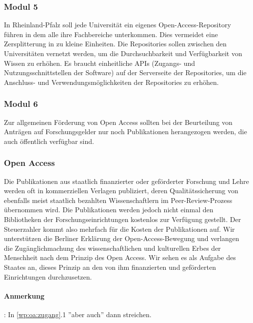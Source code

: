 \subsubsection{Modul 5}
\abstimmung
In Rheinland-Pfalz soll jede Universität ein eigenes Open-Access-Repository führen in dem alle ihre Fachbereiche unterkommen. Dies vermeidet eine Zersplitterung in zu kleine Einheiten. Die Repositories sollen zwischen den Universitäten vernetzt werden, um die Durchsuchbarkeit und Verfügbarkeit von Wissen zu erhöhen. Es braucht einheitliche APIs (Zugangs- und Nutzungsschnittstellen der Software) auf der Serverseite der Repositories, um die Anschluss- und Verwendungsmöglichkeiten der Repositories zu erhöhen.

\subsubsection{Modul 6}
\abstimmung
Zur allgemeinen Förderung von Open Access sollten bei der Beurteilung von Anträgen auf Forschungsgelder nur noch Publikationen herangezogen werden, die auch öffentlich verfügbar sind.
 

\subsubsection{Open Access}
\abstimmung
Die Publikationen aus staatlich finanzierter oder geförderter Forschung und Lehre werden oft in kommerziellen Verlagen publiziert, deren Qualitätssicherung von ebenfalls meist staatlich bezahlten Wissenschaftlern im Peer-Review-Prozess übernommen wird. Die Publikationen werden jedoch nicht einmal den Bibliotheken der Forschungseinrichtungen kostenlos zur Verfügung gestellt. Der Steuerzahler kommt also mehrfach für die Kosten der Publikationen auf. Wir unterstützen die Berliner Erklärung der Open-Access-Bewegung und verlangen die Zugänglichmachung des wissenschaftlichen und kulturellen Erbes der Menschheit nach dem Prinzip des Open Access. Wir sehen es als Aufgabe des Staates an, dieses Prinzip an den von ihm finanzierten und geförderten Einrichtungen durchzusetzen.
 
\paragraph{Anmerkung}: In \ref{wp:oa:zugang}.1 ''aber auch'' dann streichen.

